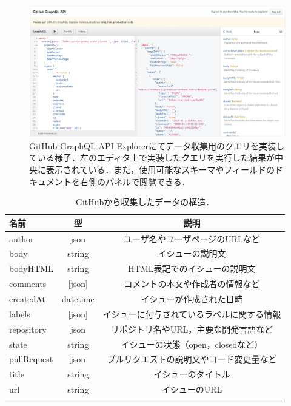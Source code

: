 

\begin{figure}[tb]
    \centering
    \includegraphics[width=1.0\columnwidth]{GitHub_api_explorer.png}
    \caption{GitHub GraphQL API Explorerにてデータ収集用のクエリを実装している様子．左のエディタ上で実装したクエリを実行した結果が中央に表示されている．また，使用可能なスキーマやフィールドのドキュメントを右側のパネルで閲覧できる．}
    \label{fig:GitHub_api_explorer}
\end{figure}


\begin{table}[t]

  \centering
  \caption{GitHubから収集したデータの構造．}
  \label{table:format_collected_GH_data}
    
  \begin{tabular}{l | c | c } \Xhline{3\arrayrulewidth}
      名前 & 型 & 説明 \\ \hline \hline
      author & json & ユーザ名やユーザページのURLなど\\
      body & string & イシューの説明文  \\
      bodyHTML & string & HTML表記でのイシューの説明文 \\
      comments & [json] & コメントの本文や作成者の情報など \\
      createdAt & datetime & イシューが作成された日時 \\
      labels & [json] & イシューに付与されているラベルに関する情報 \\
      repository & json & リポジトリ名やURL，主要な開発言語など\\  
      state & string & イシューの状態（open，closedなど） \\
      pullRequest & json & プルリクエストの説明文やコード変更量など \\
      title & string & イシューのタイトル \\
      url & string & イシューのURL \\
      
      \Xhline{3\arrayrulewidth}
  \end{tabular}
\end{table}

